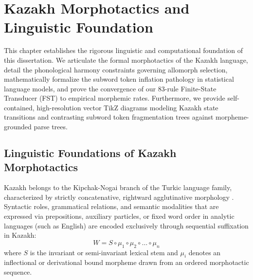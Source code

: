 \chapter{Kazakh Morphotactics and Linguistic Foundation}
\label{chap:linguistic_foundation}

This chapter establishes the rigorous linguistic and computational foundation of this dissertation. We articulate the formal morphotactics of the Kazakh language, detail the phonological harmony constraints governing allomorph selection, mathematically formalize the subword token inflation pathology in statistical language models, and prove the convergence of our 83-rule Finite-State Transducer (FST) to empirical morphemic rates. Furthermore, we provide self-contained, high-resolution vector TikZ diagrams modeling Kazakh state transitions and contrasting subword token fragmentation trees against morpheme-grounded parse trees.

\section{Linguistic Foundations of Kazakh Morphotactics}
\label{sec:ling_architecture}

Kazakh belongs to the Kipchak-Nogai branch of the Turkic language family, characterized by strictly concatenative, rightward agglutinative morphology \citep{tyers2016finite,bekmanova2021kazakh}. Syntactic roles, grammatical relations, and semantic modalities that are expressed via prepositions, auxiliary particles, or fixed word order in analytic languages (such as English) are encoded exclusively through sequential suffixation in Kazakh:
\begin{equation}
\label{eq:ling_word_concat}
W = S \circ \mu_1 \circ \mu_2 \circ \dots \circ \mu_n
\end{equation}
where $S$ is the invariant or semi-invariant lexical stem and $\mu_i$ denotes an inflectional or derivational bound morpheme drawn from an ordered morphotactic sequence.

